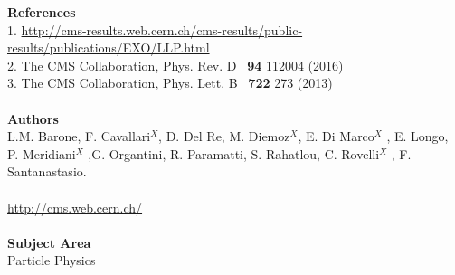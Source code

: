 \documentclass[twocolumn,twoside,10pt,nodate]{article}
\begin{document}



\vfill
\small{
\noindent
\textbf{References}
\\
1. \url{http://cms-results.web.cern.ch/cms-results/public-results/publications/EXO/LLP.html}\\
2. The CMS Collaboration, Phys. Rev. D \ \textbf{94} 112004 (2016) \\
3. The CMS Collaboration, Phys. Lett. B \ \textbf{722} 273 (2013)
\\
\\
\noindent
\textbf{Authors}
\\
L.M. Barone, F. Cavallari$^X$, D. Del Re, M. Diemoz$^X$, E. Di Marco$^X$ , E. Longo, P. Meridiani$^X$ ,G. Organtini, R. Paramatti, S. Rahatlou, C. Rovelli$^X$ , F. Santanastasio.
\\
\\
\url{http://cms.web.cern.ch/}
\\
\\
\noindent
\textbf{Subject Area}
\\
%
%
Particle Physics
%
}
\end{document}
